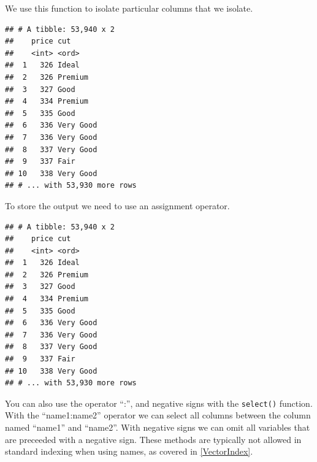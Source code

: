 \documentclass[
]{book}
\newenvironment{Shaded}{\begin{snugshade}}{\end{snugshade}}
\newcommand{\CommentTok}[1]{\textcolor[rgb]{0.56,0.35,0.01}{\textit{#1}}}
\newcommand{\KeywordTok}[1]{\textcolor[rgb]{0.13,0.29,0.53}{\textbf{#1}}}
\newcommand{\NormalTok}[1]{#1}
\newcommand{\OperatorTok}[1]{\textcolor[rgb]{0.81,0.36,0.00}{\textbf{#1}}}
\newcommand{\StringTok}[1]{\textcolor[rgb]{0.31,0.60,0.02}{#1}}
\begin{document}
We use this function to isolate particular columns that we isolate.

\begin{Shaded}
\end{Shaded}

\begin{verbatim}
## # A tibble: 53,940 x 2
##    price cut      
##    <int> <ord>    
##  1   326 Ideal    
##  2   326 Premium  
##  3   327 Good     
##  4   334 Premium  
##  5   335 Good     
##  6   336 Very Good
##  7   336 Very Good
##  8   337 Very Good
##  9   337 Fair     
## 10   338 Very Good
## # ... with 53,930 more rows
\end{verbatim}

To store the output we need to use an assignment operator.

\begin{Shaded}
\end{Shaded}

\begin{verbatim}
## # A tibble: 53,940 x 2
##    price cut      
##    <int> <ord>    
##  1   326 Ideal    
##  2   326 Premium  
##  3   327 Good     
##  4   334 Premium  
##  5   335 Good     
##  6   336 Very Good
##  7   336 Very Good
##  8   337 Very Good
##  9   337 Fair     
## 10   338 Very Good
## # ... with 53,930 more rows
\end{verbatim}

You can also use the operator ``:'', and negative signs with the \texttt{select()} function. With the ``name1:name2'' operator we can select all columns between the column named ``name1'' and ``name2''. With negative signs we can omit all variables that are preceeded with a negative sign. These methods are typically not allowed in standard indexing when using names, as covered in \ref{VectorIndex}.

\begin{Shaded}
\end{Shaded}
\end{document}
